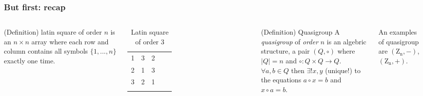 \begin{frame}
	\frametitle{But first: recap}
	\begin{columns}
		\begin{block}{(Definition) latin square of order $n$}
			is an $n \times n$ array where each row and column contains all symbols $\{1,...,n\}$ exactly one time.
		\end{block}
	\begin{table}[]
		\begin{tabular}{cccll}
			\cline{1-3}
			\multicolumn{1}{|c|}{1} & \multicolumn{1}{c|}{3} & \multicolumn{1}{c|}{2} &  &  \\ \cline{1-3}
			\multicolumn{1}{|c|}{2} & \multicolumn{1}{c|}{1} & \multicolumn{1}{c|}{3} &  &  \\ \cline{1-3}
			\multicolumn{1}{|c|}{3} & \multicolumn{1}{c|}{2} & \multicolumn{1}{c|}{1} &  &  \\ \cline{1-3}
			\multicolumn{1}{l}{}    & \multicolumn{1}{l}{}   & \multicolumn{1}{l}{}   &  & 
		\end{tabular}
	\caption{Latin square of order $3$}
	\end{table}
	
		\begin{block}{(Definition) Quasigroup}
		A \textit{quasigroup} of \textit{order} $n$ is an algebric structure, a pair $(Q,\circ)$ where $|Q|=n$ and $\circ : Q \times Q \rightarrow Q$.\\ $\forall a,b \in Q$ then $\exists! x,y$ (unique!) to the equations $a \circ x = b$ and $x \circ a = b$. 
		\end{block}

		An examples of quasigroup are $(\mathrm{Z_n},-)$,$(\mathrm{Z_n},+)$.
	\end{columns}
\end{frame}

